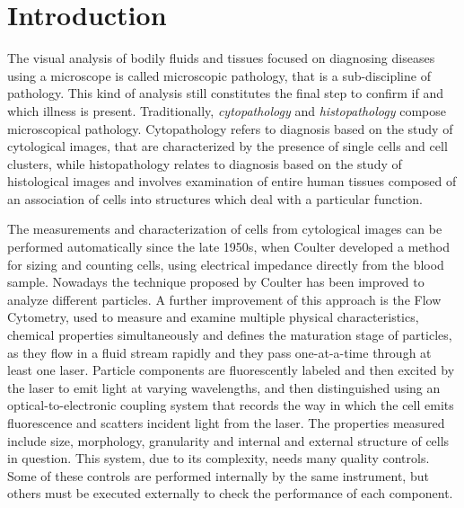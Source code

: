 \documentclass[final,a4paper,12pt,english]{UnicaPhdThesis3}
\begin{document}
\tableofcontents

\listoffigures 

\listoftables

\newpage
\printacronyms[include-classes=abbrev, name=Acronyms]

\chapter{Introduction}
The visual analysis of bodily fluids and tissues focused on diagnosing diseases using a microscope is called microscopic pathology, that is a sub-discipline of pathology. This kind of analysis still constitutes the final step to confirm if and which illness is present. Traditionally, \textit{cytopathology} and \textit{histopathology} compose microscopical pathology. Cytopathology refers to diagnosis based on the study of cytological images, that are characterized by the presence of single cells and cell clusters, while histopathology relates to diagnosis based on the study of histological images and involves examination of entire human tissues composed of an association of cells into structures which deal with a particular function.

The measurements and characterization of cells from cytological images can be performed automatically since the late 1950s, when Coulter \cite{Coulter} developed a method for sizing and counting cells, using electrical impedance directly from the blood sample. Nowadays the technique proposed by Coulter has been improved to analyze different particles. A further improvement of this approach is the Flow Cytometry,  used to measure and examine multiple physical characteristics, chemical properties simultaneously and defines the maturation stage of particles, as they flow in a fluid stream rapidly and they pass one-at-a-time through at least one laser. Particle components are fluorescently labeled and then excited by the laser to emit light at varying wavelengths, and then distinguished using an optical-to-electronic coupling system that records the way in which the cell emits fluorescence and scatters incident light from the laser. The properties measured include size, morphology, granularity and internal and external structure of cells in question. This system, due to its complexity, needs many quality controls. Some of these controls are performed internally by the same instrument, but others must be executed externally to check the performance of each component.
\end{document}
